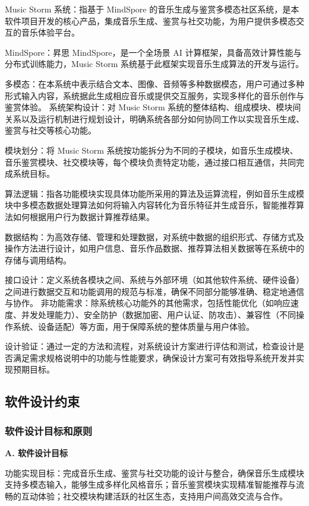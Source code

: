 \documentclass{base}
\numberwithin{figure}{section} %
\begin{document}
Music Storm 系统：指基于 MindSpore 的音乐生成与鉴赏多模态社区系统，是本软件项目开发的核心产品，集成音乐生成、鉴赏与社交功能，为用户提供多模态交互的音乐体验平台。​

MindSpore：昇思 MindSpore，是一个全场景 AI 计算框架，具备高效计算性能与分布式训练能力，Music Storm 系统基于此框架实现音乐生成算法的开发与运行。​

多模态：在本系统中表示结合文本、图像、音频等多种数据模态，用户可通过多种形式输入内容，系统据此生成相应音乐或提供交互服务，实现多样化的音乐创作与鉴赏体验。
系统架构设计：对 Music Storm 系统的整体结构、组成模块、模块间关系以及运行机制进行规划设计，明确系统各部分如何协同工作以实现音乐生成、鉴赏与社交等核心功能。​

模块划分：将 Music Storm 系统按功能拆分为不同的子模块，如音乐生成模块、音乐鉴赏模块、社交模块等，每个模块负责特定功能，通过接口相互通信，共同完成系统目标。​

算法逻辑：指各功能模块实现具体功能所采用的算法及运算流程，例如音乐生成模块中多模态数据处理算法如何将输入内容转化为音乐特征并生成音乐，智能推荐算法如何根据用户行为数据计算推荐结果。​

数据结构：为高效存储、管理和处理数据，对系统中数据的组织形式、存储方式及操作方法进行设计，如用户信息、音乐作品数据、推荐算法相关数据等在系统中的存储与调用结构。​

接口设计：定义系统各模块之间、系统与外部环境（如其他软件系统、硬件设备）之间进行数据交互和功能调用的规范与标准，确保不同部分能够准确、稳定地通信与协作。
非功能需求：除系统核心功能外的其他需求，包括性能优化（如响应速度、并发处理能力）、安全防护（数据加密、用户认证、防攻击）、兼容性（不同操作系统、设备适配）等方面，用于保障系统的整体质量与用户体验。​

设计验证：通过一定的方法和流程，对系统设计方案进行评估和测试，检查设计是否满足需求规格说明中的功能与性能要求，确保设计方案可有效指导系统开发并实现预期目标。

\subsection{软件设计约束}

\subsubsection{软件设计目标和原则}

\textbf{A. 软件设计目标​}

功能实现目标：完成音乐生成、鉴赏与社交功能的设计与整合，确保音乐生成模块支持多模态输入，能够生成多样化风格音乐；音乐鉴赏模块实现精准智能推荐与流畅的互动体验；社交模块构建活跃的社区生态，支持用户间高效交流与合作。
\end{document}
